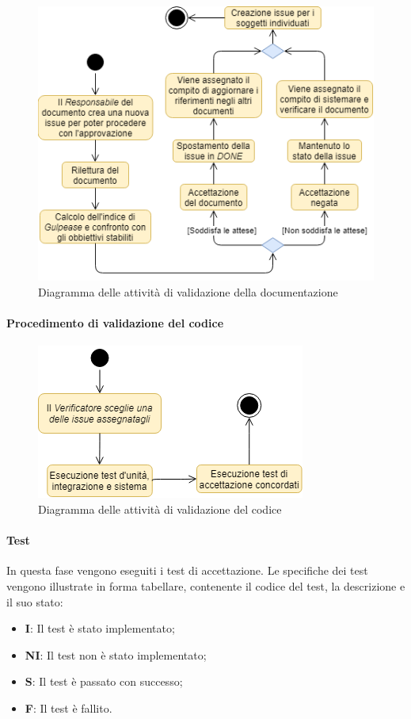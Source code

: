 \begin{figure}[!htb]
     \centering
     \includegraphics[scale=0.75]{Images/valDocs.png}
     \caption{Diagramma delle attività di validazione della documentazione}
\end{figure}


\paragraph{Procedimento di validazione del codice}


\begin{figure}[!htb]
     \centering
     \includegraphics[scale=0.8]{Images/valCode.png}
     \caption{Diagramma delle attività di validazione del codice}
\end{figure}

\paragraph{Test}
In questa fase vengono eseguiti i test di accettazione. Le specifiche dei test vengono illustrate in forma tabellare, contenente il codice del test, la descrizione e il suo stato:
	\begin{itemize}
		\item \textbf{I}: Il test è stato implementato;
		\item \textbf{NI}: Il test non è stato implementato;
		\item \textbf{S}: Il test è passato con successo;
		\item \textbf{F}: Il test è fallito.
	\end{itemize}	 

